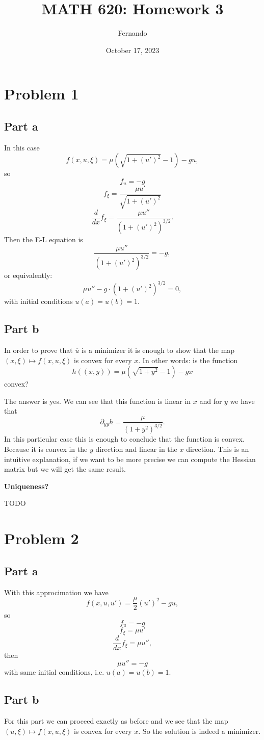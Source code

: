 \documentclass{article}
\title{MATH 620: Homework 3}
\author{Fernando}
\date{October 17, 2023}
\begin{document}
\maketitle
\section{Problem 1}
\subsection{Part a}
In this case
\[
	f(x,u,\xi)=\mu(\sqrt{1+(u')^2}-1)-gu,
\]
so
\[ f_u=-g \]
\[ f_\xi =\frac{\mu u'}{\sqrt{1+(u')^2}} \]
\[ \frac{d}{dx} f_\xi =\frac{\mu u''}{(1+(u')^2)^{3/2}}. \]
Then the E-L equation is
\[
\frac{\mu u''}{(1+(u')^2)^{3/2}} = -g,
\]
or equivalently:
\[
\mu u'' -g\cdot(1+(u')^2)^{3/2} = 0,
\]
with initial conditions $u(a)=u(b)=1$.
\subsection{Part b}
In order to prove that $\overline u$ is a minimizer it is enough to show that
the map $(x,\xi)\mapsto f(x,u,\xi)$ is convex for every $x$.
In other words: is the function
\[
	h((x,y))=\mu(\sqrt{1+y^2} -1) -gx
\]
convex?

The answer is yes. We can see that this function is linear in $x$ and for $y$
we have that
\[
	\partial_{yy} h = \frac{\mu}{(1+y^2)^{3/2}}.
\]
In this particular case this is enough to conclude that the function is convex.
Because it is convex in the $y$ direction and linear in the $x$ direction. This
is an intuitive explanation, if we want to be more precise we can compute the
Hessian matrix but we will get the same result.

\textbf{Uniqueness?}

TODO
\section{Problem 2}
\subsection{Part a}
With this approcimation we have
\[
	f(x,u,u')=\frac{\mu}{2}(u')^2 -gu,
\]
so
\[
	f_u=-g
\]
\[
	f_\xi=\mu u'
\]
\[
	\frac{d}{dx}f_\xi = \mu u'',
\]
then
\[
	\mu u''=-g
\]
with same initial conditions, i.e. $u(a)=u(b)=1$.
\subsection{Part b}
For this part we can proceed exactly as before and we see that the map
$(u,\xi)\mapsto f(x,u,\xi)$ is convex for every $x$. So the solution is indeed
a minimizer.
\end{document}
